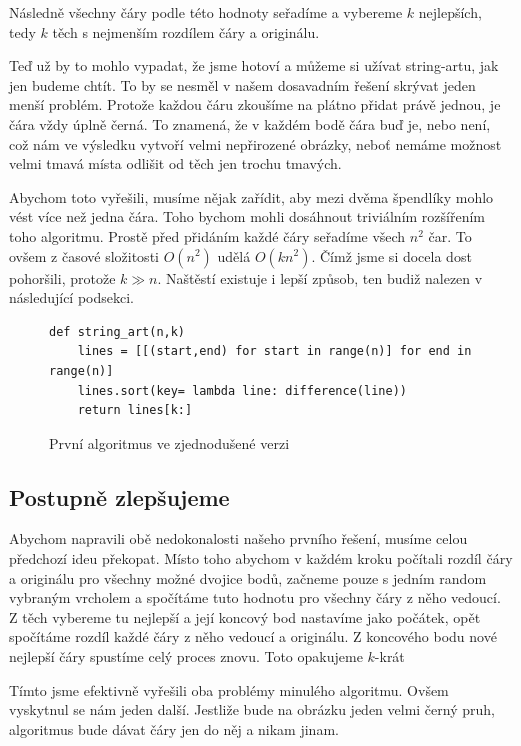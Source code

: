 \documentclass{article}
\begin{document}
Následně všechny čáry podle této hodnoty seřadíme a vybereme $k$ nejlepších, tedy $k$ těch s nejmenším rozdílem čáry a originálu.

Teď už by to mohlo vypadat, že jsme hotoví a můžeme si užívat string-artu, jak
jen budeme chtít. To by se nesměl v našem dosavadním řešení skrývat jeden menší
problém. Protože každou čáru zkoušíme na plátno přidat právě jednou, je čára vždy
úplně černá. To znamená, že v každém bodě čára buď je, nebo není, což nám ve
výsledku vytvoří velmi nepřirozené obrázky, neboť nemáme možnost velmi tmavá místa odlišit od těch jen trochu tmavých.

Abychom toto vyřešili, musíme nějak zařídit, aby mezi dvěma špendlíky mohlo vést
více než jedna čára. Toho bychom mohli dosáhnout triviálním rozšířením toho
algoritmu. Prostě před přidáním každé čáry seřadíme všech $n^2$ čar. To ovšem z
časové složitosti $O(n^2)$ udělá $O(kn^2)$. Čímž jsme si docela dost pohoršili,
protože $k \gg n$. Naštěstí existuje i lepší způsob, ten budiž nalezen v
následující podsekci.

\begin{figure}[!ht]
 \label{fig:first}
\begin{mdframed}[style=MyFrame]
\begin{lstlisting}[style=metoo]
def string_art(n,k)
    lines = [[(start,end) for start in range(n)] for end in range(n)]
    lines.sort(key= lambda line: difference(line))
    return lines[k:]
 \end{lstlisting}
\end{mdframed}
\caption{První algoritmus ve zjednodušené verzi}
\end{figure}

\subsection{Postupně zlepšujeme}
\label{ssec:postupne-zlepsujeme}

Abychom napravili obě nedokonalosti našeho prvního řešení, musíme celou předchozí ideu
překopat. Místo toho abychom v každém kroku počítali rozdíl čáry a originálu pro všechny možné dvojice bodů, začneme pouze s jedním random vybraným vrcholem a spočítáme tuto hodnotu pro všechny čáry z něho vedoucí. Z těch vybereme tu nejlepší a její koncový bod nastavíme jako počátek, opět spočítáme rozdíl každé čáry z něho vedoucí a originálu. Z koncového bodu nové nejlepší čáry spustíme celý proces znovu. Toto opakujeme $k$-krát 

Tímto jsme efektivně vyřešili oba problémy minulého
algoritmu. Ovšem vyskytnul se nám jeden další. Jestliže bude na obrázku jeden
velmi černý pruh, algoritmus bude dávat čáry jen do něj a nikam jinam. 
\end{document}
